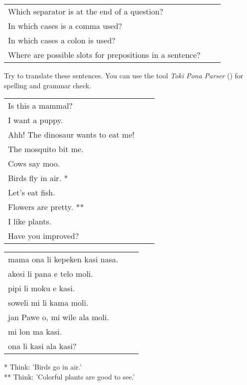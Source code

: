\begin{supertabular}{p{5,5cm}|ll}
    Which separator is at the end of a question?             &  & \\ %
    In which cases is a comma used?                          &  & \\ %
    In which cases a colon is used?                          &  & \\ %
    Where are possible slots for prepositions in a sentence? &  & \\ %
\end{supertabular}

Try to translate these sentences.
You can use the tool \textit{Toki Pona Parser} (\cite{www:rowa:02}) for spelling and grammar check.

\begin{supertabular}{p{5,5cm}|ll}
    Is this a mammal?                  &  & \\ %
    I want a puppy.                    &  & \\ %
    Ahh! The dinosaur wants to eat me! &  & \\ %
    The mosquito bit me.               &  & \\ %
    Cows say moo.                      &  & \\ %
    Birds fly in air. *                &  & \\ %
    Let's eat fish.                    &  & \\ %
    Flowers are pretty. **             &  & \\ %
    I like plants.                     &  & \\ %
    Have you improved?                 &  & \\ %
\end{supertabular}

\begin{supertabular}{p{5,5cm}|ll}
    mama ona li kepeken kasi nasa. &  & \\ %
    akesi li pana e telo moli.     &  & \\  %
    pipi li moku e kasi.           &  & \\ %
    soweli mi li kama moli.        &  & \\ %
    jan Pawe o, mi wile ala moli.  &  & \\   %
    mi lon ma kasi.                &  & \\ %
    ona li kasi ala kasi?          &  & \\ %
\end{supertabular}

* Think: 'Birds go in air.' \\
** Think: 'Colorful plants are good to see.'
